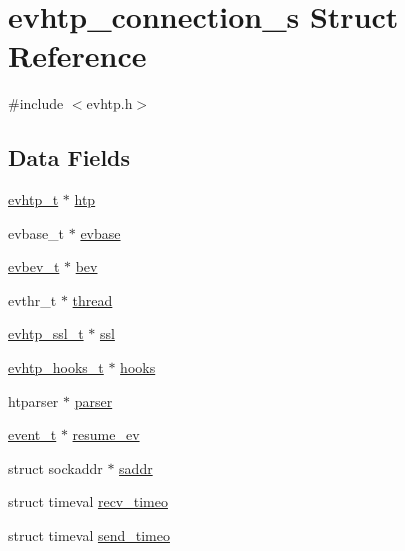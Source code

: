 \hypertarget{structevhtp__connection__s}{\section{evhtp\-\_\-connection\-\_\-s Struct Reference}
\label{structevhtp__connection__s}
}


{\ttfamily \#include $<$evhtp.\-h$>$}

\subsection*{Data Fields}
\begin{DoxyCompactItemize}
\item 
\hyperlink{evhtp_8h_aa670c92d77f9a732e03a7d48ada2b31b}{evhtp\-\_\-t} $\ast$ \hyperlink{structevhtp__connection__s_ad2f5cc5c9e97f75f1fe923c57af9e875}{htp}
\item 
evbase\-\_\-t $\ast$ \hyperlink{structevhtp__connection__s_abc4ce26b166a97e5766105f253a4fe21}{evbase}
\item 
\hyperlink{evhtp_8h_af92ce7197ff545dc83b76f1650bc57e1}{evbev\-\_\-t} $\ast$ \hyperlink{structevhtp__connection__s_a56cc56e5934366a7ca14026f5be0b3dd}{bev}
\item 
evthr\-\_\-t $\ast$ \hyperlink{structevhtp__connection__s_aaf924ac18ad3dd26c8676d835116579e}{thread}
\item 
\hyperlink{evhtp_8h_a85b31561e6827b118669d514fe00aa3d}{evhtp\-\_\-ssl\-\_\-t} $\ast$ \hyperlink{structevhtp__connection__s_a9d5e6d2a2098e174347708a6d561b2ec}{ssl}
\item 
\hyperlink{evhtp_8h_ac77d779459ec62f309d1fb09c5540786}{evhtp\-\_\-hooks\-\_\-t} $\ast$ \hyperlink{structevhtp__connection__s_ac97663394f74c9030e57c771cfb7981e}{hooks}
\item 
htparser $\ast$ \hyperlink{structevhtp__connection__s_accaeb42c4c926437fc7921fa7910911b}{parser}
\item 
\hyperlink{evhtp_8h_ad0c066ffb009d3286186a124d37a0c2d}{event\-\_\-t} $\ast$ \hyperlink{structevhtp__connection__s_a7a583b9c2322f322b8785b9cff0e9585}{resume\-\_\-ev}
\item 
struct sockaddr $\ast$ \hyperlink{structevhtp__connection__s_a95957a2d67e88843dae4b71c658b6ecb}{saddr}
\item 
struct timeval \hyperlink{structevhtp__connection__s_a485801666b7fb0cccc50d9fa42e5cbb9}{recv\-\_\-timeo}
\item 
struct timeval \hyperlink{structevhtp__connection__s_a7ffa291d73974047489f8880e5363603}{send\-\_\-timeo}

\end{DoxyCompactItemize}

